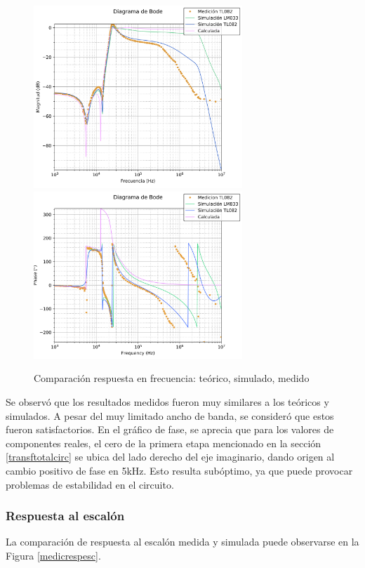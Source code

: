 \documentclass[spanish]{article}
\begin{document}
\begin{figure}[H]
    \centering
    \includegraphics[width=0.7\textwidth]{Resources/medicrespfrec.png}
    \includegraphics[width=0.7\textwidth]{Resources/medicrespfrecfase.png}
    \caption{Comparación respuesta en frecuencia: teórico, simulado, medido}
    \label{medicrespfrec}
\end{figure}

Se observó que los resultados medidos fueron muy similares a los teóricos y simulados. A pesar del muy limitado ancho de banda, se consideró que estos fueron satisfactorios. En el gráfico de fase, se aprecia que para los valores de componentes reales, el cero de la primera etapa mencionado en la sección \ref{transftotalcirc} se ubica del lado derecho del eje imaginario, dando origen al cambio positivo de fase en 5kHz. Esto resulta subóptimo, ya que puede provocar problemas de estabilidad en el circuito.

\subsubsection{Respuesta al escalón}
La comparación de respuesta al escalón medida y simulada puede observarse en la Figura \ref{medicrespesc}.
\end{document}
